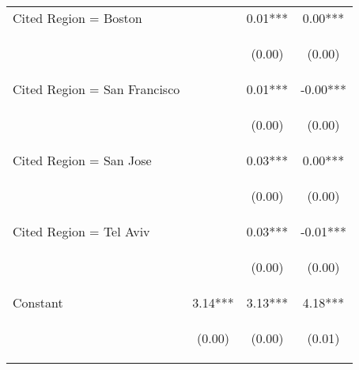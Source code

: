 \begin{center}
\begin{tabular}{lccc}
Cited Region = Boston &  & 0.01*** & 0.00*** \\
\vspace{4pt} & \begin{footnotesize}\end{footnotesize} & \begin{footnotesize}(0.00)\end{footnotesize} & \begin{footnotesize}(0.00)\end{footnotesize} \\
Cited Region = San Francisco &  & 0.01*** & -0.00*** \\
\vspace{4pt} & \begin{footnotesize}\end{footnotesize} & \begin{footnotesize}(0.00)\end{footnotesize} & \begin{footnotesize}(0.00)\end{footnotesize} \\
Cited Region = San Jose &  & 0.03*** & 0.00*** \\
\vspace{4pt} & \begin{footnotesize}\end{footnotesize} & \begin{footnotesize}(0.00)\end{footnotesize} & \begin{footnotesize}(0.00)\end{footnotesize} \\
Cited Region = Tel Aviv &  & 0.03*** & -0.01*** \\
\vspace{4pt} & \begin{footnotesize}\end{footnotesize} & \begin{footnotesize}(0.00)\end{footnotesize} & \begin{footnotesize}(0.00)\end{footnotesize} \\
Constant & 3.14*** & 3.13*** & 4.18*** \\
 & \begin{footnotesize}(0.00)\end{footnotesize} & \begin{footnotesize}(0.00)\end{footnotesize} & \begin{footnotesize}(0.01)\end{footnotesize} \\

\end{tabular}
\end{center}
